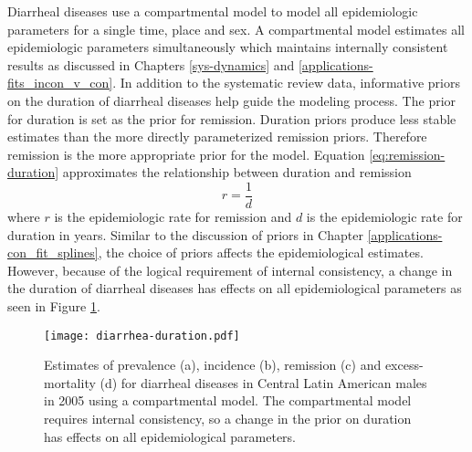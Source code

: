 Diarrheal diseases use a compartmental model to model all epidemiologic parameters for a single time, place and sex.  A compartmental model estimates all epidemiologic parameters simultaneously which maintains internally consistent results as discussed in Chapters \ref{sys-dynamics} and \ref{applications-fits_incon_v_con}.  In addition to the systematic review data, informative priors on the duration of diarrheal diseases help guide the modeling process.  The prior for duration is set as the prior for remission.  Duration priors produce less stable estimates than the more directly parameterized remission priors.  Therefore remission is the more appropriate prior for the model.  Equation \ref{eq:remission-duration} approximates the relationship between duration and remission
    \begin{equation} \label{eq:remission-duration}
    	r = \frac{1}{d}
    \end{equation}
where $r$ is the epidemiologic rate for remission and $d$ is the epidemiologic rate for duration in years.  Similar to the discussion of priors in Chapter \ref{applications-con_fit_splines}, the choice of priors affects the epidemiological estimates.  However, because of the logical requirement of internal consistency, a change in the duration of diarrheal diseases has effects on all epidemiological parameters as seen in Figure \ref{fig:app-diarrhea duration}.

    \begin{figure}[h]
        \begin{center}
            \texttt{[image: diarrhea-duration.pdf]}
            \caption{Estimates of prevalence (a), incidence (b), remission (c) and excess-mortality (d) for diarrheal diseases in Central Latin American males in 2005 using a compartmental model.  The compartmental model requires internal consistency, so a change in the prior on duration has effects on all epidemiological parameters.}
            \label{fig:app-diarrhea duration}
        \end{center}
    \end{figure}
